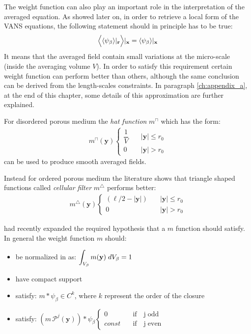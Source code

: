 The weight function can  also play an important role in the interpretation of the averaged equation. As showed later on, in order to retrieve a local form of the VANS equations, the following statement should in principle has to be true:
\begin{equation}
\Big\langle {\left< \psi_{\beta} \right>}|_{\mathbf{r}}  \Big\rangle  |_{\mathbf{x}} = {\left< \psi_{\beta} \right>}|_{\mathbf{x}}
\label{eq:well_behaved}
\end{equation}
It means that the averaged field contain small variations at the micro-scale (inside the averaging volume $V$).
In order to satisfy this requirement certain weight function can perform better than others, although the same conclusion can be derived from the length-scales constraints.
In paragraph \ref{ch:appendix_a}, at the end of this chapter, some details of this approximation are further explained.

For disordered porous medium the \textit{hat function} $m^{\sqcap}$ which has the form:
\begin{eqnarray}
	m^{\sqcap}(\mathbf{y}) 
	\begin{cases}
		\dfrac{1}{V} \quad &|\mathbf{y}| \leqslant r_0\\
		0 \quad &|\mathbf{y}|> r_0
	\end{cases}
\end{eqnarray}
can be used to produce smooth averaged fields.

Instead for ordered porous medium the literature shows that triangle shaped functions called \textit{cellular filter}  $m^{\bigtriangleup}$  performs better:
\begin{eqnarray}
m^{\bigtriangleup}(\mathbf{y}) 
\begin{cases}
(\ell/2 - |\mathbf{y}|) \quad &|\mathbf{y}| \leqslant r_0\\
0 \quad &|\mathbf{y}|> r_0
\end{cases}
\end{eqnarray}

\citet{davit2017technical} had recently expanded the required hypothesis that a $m$ function should satisfy. In general the weight function $m$ should:
\begin{itemize}
	\item be normalized in as: $\displaystyle\int_{V_\beta}  m(\mathbf{y}) \; dV_\beta = 1$
	\item have compact support 
	\item satisfy: $m*\psi_{\beta} \in C^{k}$, where $k$ represent the order of the closure
	\item satisfy: $(m \, \mathcal{P}^j(\mathbf{y}))*\psi_{\beta}
	\begin{cases}
	0 \quad &\textrm{if}\quad \textrm{j} \; \textrm{odd}\\
	const  \quad &\textrm{if}\quad \textrm{j} \; \textrm{even}
	\end{cases}$
\end{itemize}

